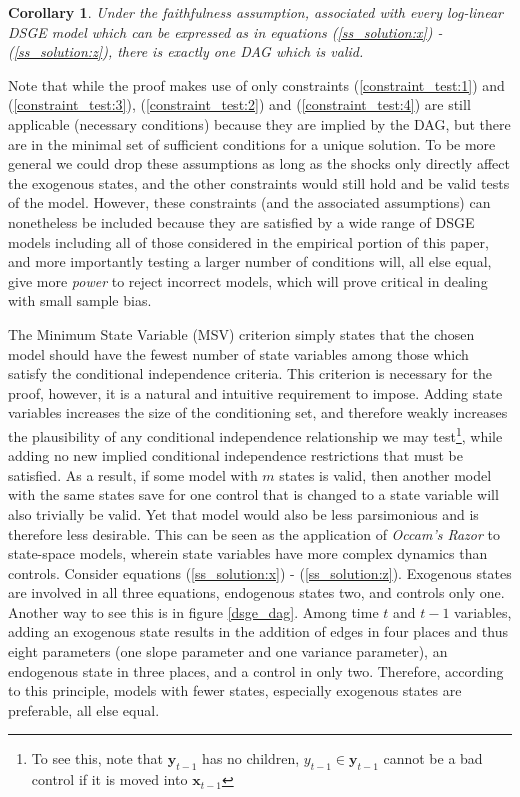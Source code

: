 \documentclass{article}
\newtheorem{corollary}{Corollary}
\begin{document}
\theoremstyle{corollary}
\begin{corollary}
  Under the faithfulness assumption, associated with every log-linear DSGE model which can be expressed as in equations (\ref{ss_solution:x}) - (\ref{ss_solution:z}), there is exactly one DAG which is valid.
\end{corollary}

Note that while the proof makes use of only constraints (\ref{constraint_test:1}) and (\ref{constraint_test:3}), (\ref{constraint_test:2}) and (\ref{constraint_test:4}) are still applicable (necessary conditions) because they are implied by the DAG, but there are in the minimal set of sufficient conditions for a unique solution. To be more general we could drop these assumptions as long as the shocks only directly affect the exogenous states, and the other constraints would still hold and be valid tests of the model. However, these constraints (and the associated assumptions) can nonetheless be included because they are satisfied by a wide range of DSGE models including all of those considered in the empirical portion of this paper, and more importantly testing a larger number of conditions will, all else equal, give more \textit{power} to reject incorrect models, which will prove critical in dealing with small sample bias.

The Minimum State Variable (MSV) criterion simply states that the chosen model should have the fewest number of state variables among those which satisfy the conditional independence criteria. This criterion is necessary for the proof, however, it is a natural and intuitive requirement to impose. Adding state variables increases the size of the conditioning set, and therefore weakly increases the plausibility of any conditional independence relationship we may test\footnote{To see this, note that $\mathbf{y}_{t-1}$ has no children, $y_{t-1} \in \mathbf{y}_{t-1}$ cannot be a bad control if it is moved into $\mathbf{x}_{t-1}$}, while adding no new implied conditional independence restrictions that must be satisfied. As a result, if some model with $m$ states is valid, then another model with the same states save for one control that is changed to a state variable will also trivially be valid. Yet that model would also be less parsimonious and is therefore less desirable. This can be seen as the application of \textit{Occam's Razor} to state-space models, wherein state variables have more complex dynamics than controls. Consider equations (\ref{ss_solution:x}) - (\ref{ss_solution:z}). Exogenous states are involved in all three equations, endogenous states two, and controls only one. Another way to see this is in figure \ref{dsge_dag}. Among time $t$ and $t-1$ variables, adding an exogenous state results in the addition of edges in four places and thus eight parameters (one slope parameter and one variance parameter), an endogenous state in three places, and a control in only two. Therefore, according to this principle, models with fewer states, especially exogenous states are preferable, all else equal. 
\end{document}
